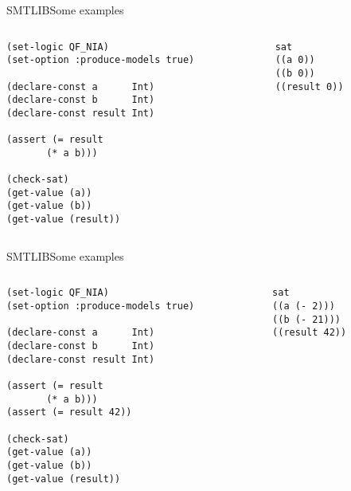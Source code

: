 \documentclass[aspectratio=169]{beamer}
\begin{document}
\begin{frame}[fragile]{SMTLIB}{Some examples}
  \begin{columns}
    \begin{column}{0.5\textwidth}
      \begin{lstlisting}[language=SMTLIB]
(set-logic QF_NIA)
(set-option :produce-models true)

(declare-const a      Int)
(declare-const b      Int)
(declare-const result Int)

(assert (= result
	   (* a b)))

(check-sat)
(get-value (a))
(get-value (b))
(get-value (result))
\end{lstlisting}
\end{column}
    \pause
    \begin{column}{0.5\textwidth}
      \begin{scriptsize}
\begin{verbatim}
sat
((a 0))
((b 0))
((result 0))
\end{verbatim}
      \end{scriptsize}
    \end{column}
  \end{columns}
\end{frame}

\begin{frame}[fragile]{SMTLIB}{Some examples}
  \begin{columns}
    \begin{column}{0.5\textwidth}
      \begin{lstlisting}[language=SMTLIB]
(set-logic QF_NIA)
(set-option :produce-models true)

(declare-const a      Int)
(declare-const b      Int)
(declare-const result Int)

(assert (= result
	   (* a b)))
(assert (= result 42))

(check-sat)
(get-value (a))
(get-value (b))
(get-value (result))
\end{lstlisting}
\end{column}
    \pause
    \begin{column}{0.5\textwidth}
      \begin{scriptsize}
\begin{verbatim}
sat
((a (- 2)))
((b (- 21)))
((result 42))
\end{verbatim}
      \end{scriptsize}
    \end{column}
  \end{columns}
\end{frame}
\end{document}
